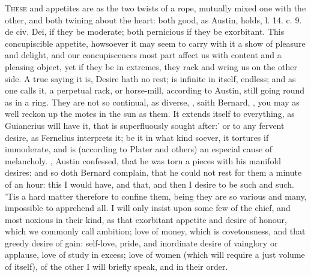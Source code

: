 {\lettrine{T}{hese}  and  appetites are as the two twists of a
rope, mutually mixed one with the other, and both twining about the
heart: both good, as Austin, holds, l. 14. c. 9. de civ. Dei, if
they be moderate; both pernicious if they be exorbitant. This
concupiscible appetite, howsoever it may seem to carry with it a show
of pleasure and delight, and our concupiscences most part affect us
with content and a pleasing object, yet if they be in extremes, they
rack and wring us on the other side. A true saying it is, Desire hath
no rest; is infinite in itself, endless; and as one calls it, a
perpetual rack, or horse-mill, according to Austin, still going
round as in a ring. They are not so continual, as diverse, , saith Bernard, , you may as well reckon up the motes in the sun
as them. It extends itself to everything, as Guianerius will have
it, that is superfluously sought after:' or to any fervent
desire, as Fernelius interprets it; be it in what kind soever, it
tortures if immoderate, and is (according to Plater and others)
an especial cause of melancholy. , Austin confessed, that he was torn a pieces
with his manifold desires: and so doth Bernard complain, that he
could not rest for them a minute of an hour: this I would have, and
that, and then I desire to be such and such. 'Tis a hard matter
therefore to confine them, being they are so various and many,
impossible to apprehend all. I will only insist upon some few of the
chief, and most noxious in their kind, as that exorbitant appetite and
desire of honour, which we commonly call ambition; love of money, which
is covetousness, and that greedy desire of gain: self-love, pride, and
inordinate desire of vainglory or applause, love of study in excess;
love of women (which will require a just volume of itself), of the
other I will briefly speak, and in their order.

}

